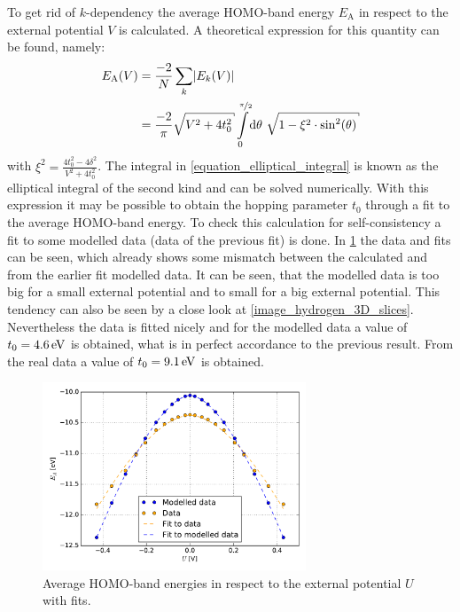 To get rid of $k$-dependency the average HOMO-band energy $E_\text{A}$ in respect to the external potential $V$ is calculated. A theoretical expression for this quantity can be found, namely:
\begin{align}
	E_\text{A}(V) &= \frac{-2}{N}\sum_k \left|E_k(V)\right|\\
				  &= \frac{-2}{\pi}\sqrt{V^2+4t_0^2}\int\limits_0^{\nicefrac{\pi}{2}}\dd\theta\ \sqrt{1-\xi^2\cdot\sin^2(\theta)}
				  \label{equation_elliptical_integral}
\end{align}
with $\xi^2 = \frac{4t_0^2-4\delta^2}{V^2+4t_0^2}$. The integral in \cref{equation_elliptical_integral} is known as the elliptical integral of the second kind and can be solved numerically. With this expression it may be possible to obtain the hopping parameter $t_0$ through a fit to the average HOMO-band energy. To check this calculation for self-consistency a fit to some modelled data (data of the previous fit) is done. In \cref{image_hydrogen_homo_energy_charging} the data and fits can be seen, which already shows some mismatch between the calculated and from the earlier fit modelled data. It can be seen, that the modelled data is too big for a small external potential and to small for a big external potential. This tendency can also be seen by a close look at \cref{image_hydrogen_3D_slices}.\\
Nevertheless the data is fitted nicely and for the modelled data a value of $t_0 = \unit[4.6]{eV}$ is obtained, what is in perfect accordance to the previous result. From the real data a value of $t_0 = \unit[9.1]{eV}$ is obtained.\\
\begin{figure}
	\centering
	\includegraphics[width = 0.7\textwidth]{Images/Hydrogen/charging/Homo_energy_charge}
	\caption{Average HOMO-band energies in respect to the external potential $U$ with fits.}
	\label{image_hydrogen_homo_energy_charging}
\end{figure}
